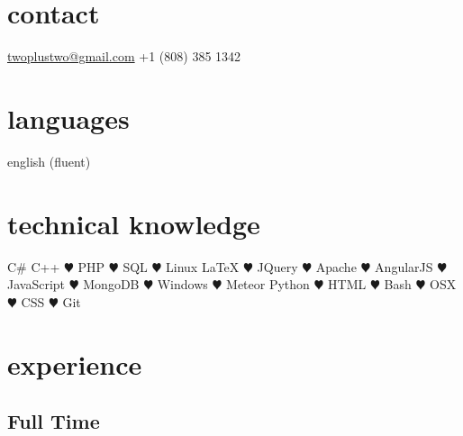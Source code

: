 \documentclass[]{friggeri-cv} %
\begin{document}


\begin{aside} %
\section{contact}
\href{mailto:twoplustwo@gmail.com}{twoplustwo@gmail.com}
+1 (808) 385 1342
\section{languages}
english (fluent)
\section{technical knowledge}
C\#
C++
{\color{red} $\varheartsuit$} PHP
{\color{red} $\varheartsuit$} SQL
{\color{red} $\varheartsuit$} Linux
LaTeX
{\color{red} $\varheartsuit$} JQuery
{\color{red} $\varheartsuit$} Apache
{\color{red} $\varheartsuit$} AngularJS
{\color{red} $\varheartsuit$} JavaScript
{\color{red} $\varheartsuit$} MongoDB
{\color{red} $\varheartsuit$} Windows
{\color{red} $\varheartsuit$} Meteor
Python
{\color{red} $\varheartsuit$} HTML
{\color{red} $\varheartsuit$} Bash
{\color{red} $\varheartsuit$} OSX
{\color{red} $\varheartsuit$} CSS
{\color{red} $\varheartsuit$} Git
\end{aside}



\section{experience}

\subsection{Full Time}
\end{document}
